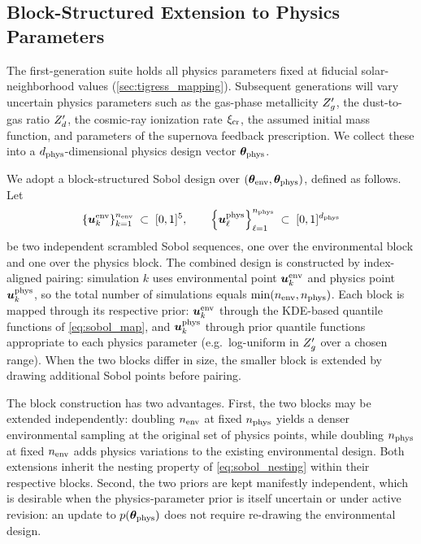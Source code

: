 \subsection{Block-Structured Extension to Physics Parameters}
\label{sec:sampling:physics}

The first-generation suite holds all physics parameters fixed at fiducial
solar-neighborhood values (\autoref{sec:tigress_mapping}). Subsequent
generations will vary uncertain physics parameters such as the gas-phase
metallicity $Z_g'$, the dust-to-gas ratio $Z_d'$, the cosmic-ray
ionization rate $\xi_{\rm cr}$, the assumed initial mass function, and
parameters of the supernova feedback prescription. We collect these
into a $d_{\rm phys}$-dimensional physics design vector $\boldsymbol{\theta}_{\rm phys}$.

We adopt a block-structured Sobol design over $(\boldsymbol{\theta}_{\rm env}, \boldsymbol{\theta}_{\rm phys})$,
defined as follows. Let
\begin{equation}
\left\{{\bm{u}^{\rm env}_k}\right\}_{k=1}^{n_{\rm env}}
\;\subset\; [0,1]^{5},
\qquad
\left\{{\bm{u}^{\rm phys}_\ell}\right\}_{\ell=1}^{n_{\rm phys}}
\;\subset\; [0,1]^{d_{\rm phys}}
\label{eq:two_sobol}
\end{equation}
be two independent scrambled Sobol sequences, one over the environmental
block and one over the physics block. The combined design is constructed by index-aligned pairing:
simulation $k$ uses environmental point $\bm{u}^{\rm env}_k$ and
physics point $\bm{u}^{\rm phys}_k$, so the total number of
simulations equals $\min(n_{\rm env}, n_{\rm phys})$. Each block is
mapped through its respective prior: $\bm{u}^{\rm env}_k$ through the
KDE-based quantile functions of \autoref{eq:sobol_map}, and
$\bm{u}^{\rm phys}_k$ through prior quantile functions appropriate to
each physics parameter (e.g.\ log-uniform in $Z_g'$ over a chosen range).
When the two blocks differ in size, the smaller block is extended by
drawing additional Sobol points before pairing.

The block construction has two advantages. First, the two blocks may be
extended independently: doubling $n_{\rm env}$ at fixed $n_{\rm phys}$
yields a denser environmental sampling at the original set of physics
points, while doubling $n_{\rm phys}$ at fixed $n_{\rm env}$ adds physics
variations to the existing environmental design. Both extensions inherit
the nesting property of \autoref{eq:sobol_nesting} within their
respective blocks. Second, the two priors are kept manifestly
independent, which is desirable when the physics-parameter prior is
itself uncertain or under active revision: an update to $p(\boldsymbol{\theta}_{\rm phys})$
does not require re-drawing the environmental design.

